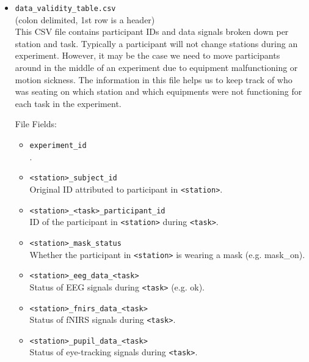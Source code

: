 \begin{itemize}
\item\verb|data_validity_table.csv|\\
    (colon delimited, 1st row is a header)\\
    This CSV file contains participant IDs and data signals broken down per station and task. Typically a participant will not change stations during an experiment. However, it may be the case we need to move participants around in the middle of an experiment due to equipment malfunctioning or motion sickness. The information in this file helps us to keep track of who was seating on which station and which equipments were not functioning for each task in the experiment.
    
File Fields:
\begin{itemize}
    \item \verb|experiment_id|\\.
    \item \verb|<station>_subject_id|\\
    Original ID attributed to participant in \verb|<station>|. 
    \item \verb|<station>_<task>_participant_id|\\
	ID of the participant in \verb|<station>| during \verb|<task>|.
	\item \verb|<station>_mask_status|\\
    Whether the participant in \verb|<station>| is wearing a mask (e.g. mask\_on).
    \item \verb|<station>_eeg_data_<task>|\\
	Status of EEG signals during \verb|<task>| (e.g. ok).
	\item \verb|<station>_fnirs_data_<task>|\\
	Status of fNIRS signals during \verb|<task>|.
	\item \verb|<station>_pupil_data_<task>|\\
	Status of eye-tracking signals during \verb|<task>|.
\end{itemize}


\end{itemize}
